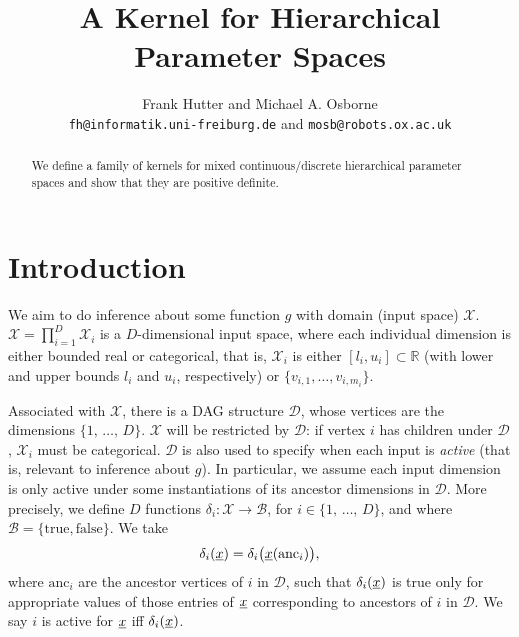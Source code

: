\documentclass[letterpaper]{article}
\newcommand{\vect}[1]{\underline{\smash{#1}}}
\renewcommand{\v}[1]{\vect{#1}}
\newcommand{\reals}{\mathds{R}}
\newcommand{\sX}{\mathcal{X}}
\newcommand{\sD}{\mathcal{D}}
\begin{document}
\title{A Kernel for Hierarchical Parameter Spaces}

\author{Frank Hutter and Michael A. Osborne\\
{\tt fh@informatik.uni-freiburg.de} and {\tt mosb@robots.ox.ac.uk}
}

\maketitle
\begin{abstract}
\noindent{}We define a family of kernels for mixed continuous/discrete hierarchical parameter spaces and show that they are positive definite.
\end{abstract}

\section{Introduction}

We aim to do inference about some function $g$ with domain (input space) $\sX$. $\sX = \prod_{i=1}^D \sX_i$ is a $D$-dimensional input space, where each individual dimension is either bounded real or categorical, that is, $\sX_i$ is either $[l_i, u_i] \subset \reals$ (with lower and upper bounds $l_i$ and $u_i$, respectively) or $\{v_{i,1}, \dots, v_{i,m_i}\}$. 

Associated with $\sX$, there is a DAG structure $\sD$, whose vertices are the dimensions $\{1,\,\ldots,\,D\}$. $\sX$ will be restricted by $\sD$: if vertex $i$ has children under $\sD$, $\sX_i$ must be categorical. $\sD$ is also used to specify when each input is \emph{active} (that is, relevant to inference about $g$). In particular, we assume each input dimension is only active under some instantiations of its ancestor dimensions in $\sD$. More precisely, we define $D$ functions $\delta_i\colon \sX\to \mathcal{B}$, for $i \in \{1,\,\ldots,\,D\}$, and where $\mathcal{B} = \{\text{true}, \text{false}\}$. We take 
\begin{equation}
 \delta_i(\v{x}) = \delta_i\bigl(\v{x}(\text{anc}_i)\bigr),
\end{equation}
where $\text{anc}_i$ are the ancestor vertices of $i$ in $\sD$, such that $\delta_i(\v{x})$ is true only for appropriate values of those entries of $\v{x}$ corresponding to ancestors of $i$ in $\sD$. We say $i$ is active for $\v{x}$ iff $\delta_i(\v{x})$.
\end{document}
